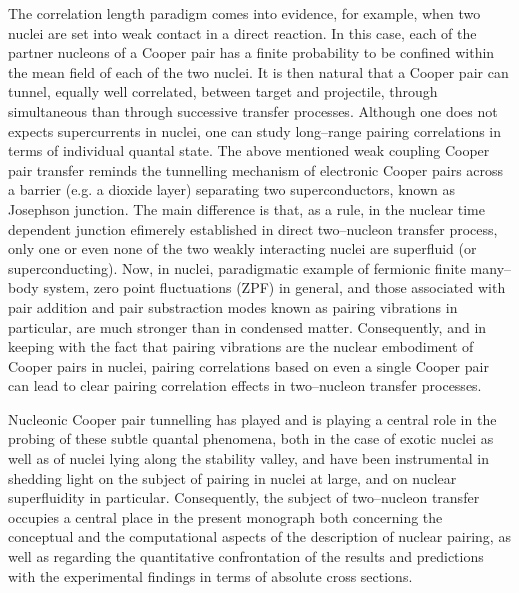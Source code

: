 The correlation length paradigm comes into evidence, for example, when two nuclei are set into weak contact in a direct reaction. In this case, each of the partner nucleons of a Cooper pair has a finite probability to be confined within the mean field of each of the two nuclei. It is then natural that a Cooper pair can tunnel, equally well correlated, between target and projectile, through simultaneous than through successive transfer processes. Although one does not expects supercurrents in nuclei, one can study long--range pairing correlations in terms of individual quantal state. The above mentioned weak coupling Cooper pair transfer reminds  the tunnelling mechanism of electronic Cooper pairs across a barrier (e.g. a dioxide layer) separating two superconductors, known as Josephson junction. The main difference is that, as a rule, in the nuclear time dependent junction efimerely established in  direct two--nucleon transfer process, only one or even none of the two weakly interacting nuclei are superfluid (or superconducting). Now, in nuclei, paradigmatic example of fermionic  finite many--body system, zero point fluctuations  (ZPF) in general, and those associated with pair addition and pair substraction modes known as pairing vibrations in particular, are much stronger than in condensed matter. Consequently, and in keeping with the fact that pairing vibrations are the nuclear embodiment of Cooper pairs in nuclei,   pairing correlations based on even  a single Cooper pair can lead to clear pairing correlation effects in two--nucleon transfer processes. 


 Nucleonic Cooper pair tunnelling has played and is playing a central role in the probing of these subtle quantal phenomena, both in the case of  exotic nuclei as well as of nuclei lying along the stability valley, and have been instrumental in shedding light on the subject of pairing in nuclei at large, and on nuclear superfluidity in particular. Consequently, the subject of two--nucleon transfer occupies  a central place in the present monograph both concerning the conceptual and the computational aspects of the description of nuclear pairing, as well as regarding the quantitative confrontation of the results and predictions with the experimental findings in terms of absolute cross sections.

